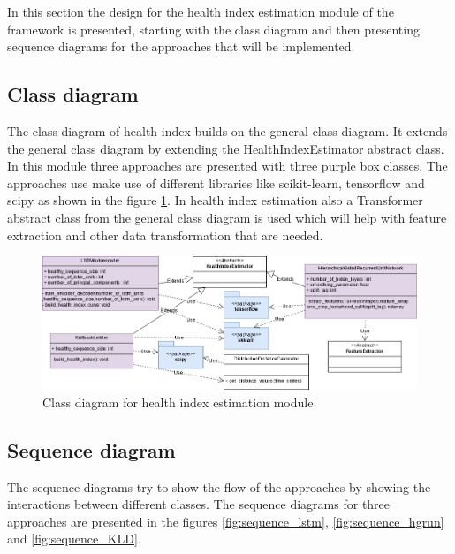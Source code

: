 In this section the design for the health index estimation module of the framework is presented, starting with the class diagram and then
presenting sequence diagrams for the approaches that will be implemented.

\subsection*{Class diagram}
The class diagram of health index builds on the general class diagram. It extends the general class diagram by extending the HealthIndexEstimator abstract class.
In this module three approaches are presented with three purple box classes. The approaches use make use of different libraries like scikit-learn, tensorflow and scipy as shown
in the figure \ref{fig:class_hie}. In health index estimation also a Transformer abstract class from the general class diagram is used which will help with
feature extraction and other data transformation that are needed.
\begin{figure}[H]
    \centering
    \includegraphics[width=\textwidth]{gfx/Interfaces-HIE.png}
    \caption{Class diagram for health index estimation module}
    \label{fig:class_hie}
\end{figure}

\subsection*{Sequence diagram}
The sequence diagrams try to show the flow of the approaches by showing the interactions between different classes. The sequence
diagrams for three approaches are presented in the figures \ref{fig:sequence_lstm}, \ref{fig:sequence_hgrun} and \ref{fig:sequence_KLD}.

